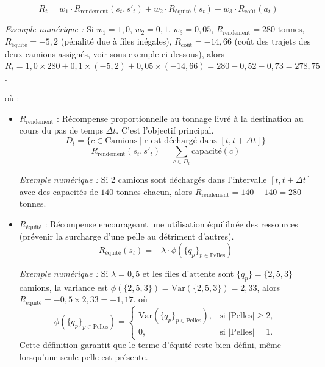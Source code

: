 \documentclass[11pt,a4paper]{report}
\begin{document}
\begin{equation}
    R_t = w_1 \cdot R_{\text{rendement}}(s_t, s'_t) + w_2 \cdot R_{\text{équité}}(s_t) + w_3 \cdot R_{\text{coût}}(a_t)
\end{equation}

\textit{Exemple numérique :} Si $w_1 = 1{,}0$, $w_2 = 0{,}1$, $w_3 = 0{,}05$, $R_{\text{rendement}} = 280$ tonnes, $R_{\text{équité}} = -5{,}2$ (pénalité due à files inégales), $R_{\text{coût}} = -14{,}66$ (coût des trajets des deux camions assignés, voir sous-exemple ci-dessous), alors $R_t = 1{,}0 \times 280 + 0{,}1 \times (-5{,}2) + 0{,}05 \times (-14{,}66) = 280 - 0{,}52 - 0{,}73 = 278{,}75$.

où :

\begin{itemize}
    \item $R_{\text{rendement}}$ : Récompense proportionnelle au tonnage livré à la destination au cours du pas de temps $\Delta t$. C'est l'objectif principal.
    \begin{equation}
        D_t = \{c \in \text{Camions} \mid c \text{ est déchargé dans } [t, t+\Delta t]\}
    \end{equation}
    \begin{equation}
        R_{\text{rendement}}(s_t, s'_t) = \sum_{c \in D_t} \text{capacit\'e}(c)
    \end{equation}

    \textit{Exemple numérique :} Si 2 camions sont déchargés dans l'intervalle $[t, t+\Delta t]$ avec des capacités de $140$ tonnes chacun, alors $R_{\text{rendement}} = 140 + 140 = 280$ tonnes.

    \item $R_{\text{équité}}$ : Récompense encourageant une utilisation équilibrée des ressources (prévenir la surcharge d'une pelle au détriment d'autres).
    \begin{equation}
        R_{\text{équité}}(s_t) = -\lambda \cdot \phi\left(\{q_p\}_{p \in \text{Pelles}}\right)
    \end{equation}

    \textit{Exemple numérique :} Si $\lambda = 0{,}5$ et les files d'attente sont $\{q_p\} = \{2, 5, 3\}$ camions, la variance est $\phi(\{2,5,3\}) = \text{Var}(\{2,5,3\}) = 2{,}33$, alors $R_{\text{équité}} = -0{,}5 \times 2{,}33 = -1{,}17$.
    où
    \begin{equation}
        \phi\left(\{q_p\}_{p \in \text{Pelles}}\right) =
        \begin{cases}
            \mathrm{Var}\left(\{q_p\}_{p \in \text{Pelles}}\right), & \text{si } |\text{Pelles}| \ge 2, \\
            0, & \text{si } |\text{Pelles}| = 1.
        \end{cases}
    \end{equation}
    Cette définition garantit que le terme d'équité reste bien défini, même lorsqu'une seule pelle est présente.
    

\end{itemize}
\end{document}
